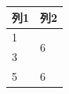 \begin{table}[H]
	\renewcommand\arraystretch{1}
	\centering
	\setlength{\abovecaptionskip}{10pt}
	\setlength{\belowcaptionskip}{0pt}
	\label{table1}  
	\begin{tabular}{p{}<{\centering}p{}<{\centering}}
		\arrayrulecolor{tablinecolor} 
		\toprule[1.5pt]
		列1 & 列2\\
		\toprule[1.5pt]
		1&\multirow{2}{*}{6}\\
		3&\\
		5&6\\
		\toprule[1.5pt]
	\end{tabular}
\end{table}

